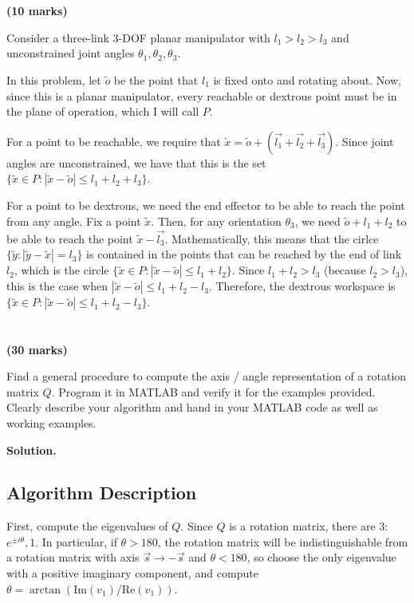 \documentclass[11pt]{article}
\begin{document}
\section{}
\textbf{(10 marks)}

Consider a three-link 3-DOF planar manipulator with $l_1 > l_2 > l_3$ and unconstrained
joint angles $\theta_1, \theta_2, \theta_3$.

In this problem, let $\tilde{o}$ be the point that $l_1$ is fixed onto and rotating about.
Now, since this is a planar manipulator, every reachable or dextrous point must be in the plane of operation, which I will call $P$.

For a point to be reachable, we require that $\tilde{x} = \tilde{o} + (\vec{l_1} + \vec{l_2} + \vec{l_3})$. Since joint angles are unconstrained, we have that this is the set $\{\tilde{x} \in P : |\tilde{x} - \tilde{o}| \leq l_1 + l_2 + l_3\}$.

For a point to be dextrous, we need the end effector to be able to reach the point from any angle.
Fix a point $\tilde{x}$.
Then, for any orientation $\theta_3$, we need $\tilde{o} + l_1 + l_2$ to be able to reach the point $\tilde{x} - \vec{l_3}$.
Mathematically, this means that the cirlce $\{\tilde{y} : |\tilde{y} - \tilde{x}| = l_3\}$ is contained in the points that can be reached by the end of link $l_2$, which is the circle $\{\tilde{x} \in P : |\tilde{x} - \tilde{o}| \leq l_1 + l_2 \}$.
Since $l_1 + l_2 > l_3$ (because $l_2 > l_3$), this is the case when $|\tilde{x} - \tilde{o}| \leq l_1 + l_2 - l_3$.
Therefore, the dextrous workspace is $\{\tilde{x} \in P : |\tilde{x} - \tilde{o} | \le l_1 + l_2 - l_3\}$.


\section{}
\textbf{(30 marks)}


Find a general procedure to compute the axis / angle representation of a rotation matrix
$Q$. Program it in MATLAB and verify it for the examples provided. Clearly describe your algorithm and hand in your MATLAB code as well as working examples.

\textbf{Solution.}
\subsection*{Algorithm Description}
First, compute the eigenvalues of $Q$.
Since $Q$ is a rotation matrix, there are 3: $e^{\pm i\theta}, 1$.
In particular, if $\theta > 180$, the rotation matrix will be indistinguishable from a rotation matrix with axis $\vec{s} \to -\vec{s}$ and $\theta < 180$, so choose the only eigenvalue with a positive imaginary component, and compute $\theta = \arctan(\textrm{Im}(v_1) / \textrm{Re}(v_1))$.
\end{document}
